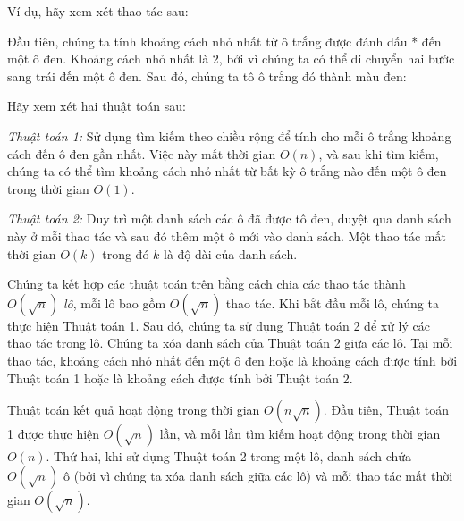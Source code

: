 Ví dụ, hãy xem xét thao tác sau:

\begin{center}
\end{center}

Đầu tiên, chúng ta tính khoảng cách nhỏ nhất
từ ô trắng được đánh dấu * đến một ô đen.
Khoảng cách nhỏ nhất là 2, bởi vì chúng ta có thể di chuyển
hai bước sang trái đến một ô đen.
Sau đó, chúng ta tô ô trắng đó thành màu đen:

\begin{center}
\end{center}

Hãy xem xét hai thuật toán sau:

\emph{Thuật toán 1:} Sử dụng tìm kiếm theo chiều rộng
để tính
cho mỗi ô trắng khoảng cách đến ô đen gần nhất.
Việc này mất thời gian $O(n)$, và sau khi tìm kiếm,
chúng ta có thể tìm khoảng cách nhỏ nhất từ bất kỳ ô trắng nào
đến một ô đen trong thời gian $O(1)$.

\emph{Thuật toán 2:} Duy trì một danh sách các ô đã được
tô đen, duyệt qua danh sách này ở mỗi thao tác
và sau đó thêm một ô mới vào danh sách.
Một thao tác mất thời gian $O(k)$ trong đó $k$ là độ dài của danh sách.

Chúng ta kết hợp các thuật toán trên bằng cách
chia các thao tác thành
$O(\sqrt n)$ \emph{lô}, mỗi lô bao gồm
$O(\sqrt n)$ thao tác.
Khi bắt đầu mỗi lô,
chúng ta thực hiện Thuật toán 1.
Sau đó, chúng ta sử dụng Thuật toán 2 để xử lý các thao tác
trong lô.
Chúng ta xóa danh sách của Thuật toán 2 giữa
các lô.
Tại mỗi thao tác,
khoảng cách nhỏ nhất đến một ô đen
hoặc là khoảng cách được tính bởi Thuật toán 1
hoặc là khoảng cách được tính bởi Thuật toán 2.

Thuật toán kết quả hoạt động trong
thời gian $O(n \sqrt n)$.
Đầu tiên, Thuật toán 1 được thực hiện $O(\sqrt n)$ lần,
và mỗi lần tìm kiếm hoạt động trong thời gian $O(n)$.
Thứ hai, khi sử dụng Thuật toán 2 trong một lô,
danh sách chứa $O(\sqrt n)$ ô
(bởi vì chúng ta xóa danh sách giữa các lô)
và mỗi thao tác mất thời gian $O(\sqrt n)$.


